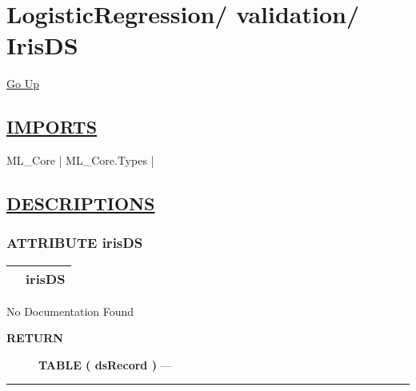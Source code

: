 \chapter*{\color{headfile}
{\large LogisticRegression\slash\hspace{0pt}}
{\large validation\slash\hspace{0pt}}
 \\
IrisDS
}
\hypertarget{ecldoc:toc:LogisticRegression.validation.IrisDS}{}
\hyperlink{ecldoc:toc:root/LogisticRegression/validation}{Go Up}

\section*{\underline{\textsf{IMPORTS}}}
\begin{doublespace}
{\large
ML\_Core |
ML\_Core.Types |
}
\end{doublespace}

\section*{\underline{\textsf{DESCRIPTIONS}}}
\subsection*{\textsf{\colorbox{headtoc}{\color{white} ATTRIBUTE}
irisDS}}

\hypertarget{ecldoc:logisticregression.validation.irisds}{}

{\renewcommand{\arraystretch}{1.5}
\begin{tabularx}{\textwidth}{|>{\raggedright\arraybackslash}l|X|}
\hline
\hspace{0pt}\mytexttt{\color{red} } & \textbf{irisDS} \\
\hline
\end{tabularx}
}

\par





No Documentation Found








\par
\begin{description}
\item [\colorbox{tagtype}{\color{white} \textbf{\textsf{RETURN}}}] \textbf{TABLE ( dsRecord )} --- 
\end{description}




\rule{\linewidth}{0.5pt}
